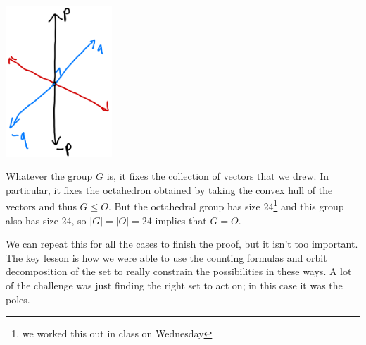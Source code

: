 \begin{example}
\begin{center}
    \includegraphics[width=4cm]{Lecture Files and Images/lec18-rightpoles.png}
\end{center}
Whatever the group $G$ is, it fixes the collection of vectors that we drew. In particular, it fixes the octahedron obtained by taking the convex hull of the vectors and thus $G\leq O$. But the octahedral group has size 24\footnote{we worked this out in class on Wednesday} and this group also has size 24, so $|G| = |O| = 24$ implies that $G = O.$

\end{example}

We can repeat this for all the cases to finish the proof, but it isn't too important. 
The key lesson is how we were able to use the counting formulas and orbit decomposition of the set to really constrain the possibilities in these ways.
A lot of the challenge was just finding the right set to act on; in this case it was the poles. 

\newpage